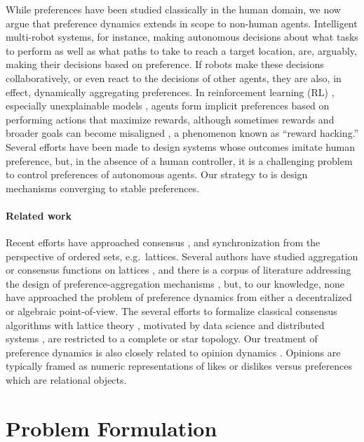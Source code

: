 \documentclass[conference]{ieeeconf}
\begin{document}
While preferences have been studied classically in the human domain, we now argue that preference dynamics extends in scope to non-human agents.
Intelligent multi-robot systems, for instance, making autonomous decisions about what tasks to perform as well as what paths to take to reach a target location, are, arguably, making their decisions based on preference. If robots make these decisions collaboratively, or even react to the decisions of other agents, they are also, in effect, dynamically aggregating preferences. In reinforcement learning (RL) \cite{furnkranz2012,wirth2017,natarajan2005}, especially unexplainable models \cite{christiano2017}, agents form implicit preferences based on performing actions that maximize rewards, although sometimes rewards and broader goals can become misaligned \cite{pan2022}, a phenomenon known as ``reward hacking.'' Several efforts \cite{huang2021,korbak2023,ibarz2018} have been made to design systems whose outcomes imitate human preference, but, in the absence of a human controller, it is a challenging problem to control preferences of autonomous agents. Our strategy to is design  mechanisms converging to stable preferences.

\paragraph*{Related work}

Recent efforts have approached consensus \cite{riess2022}, and synchronization \cite{riess2023} from the perspective of ordered sets, e.g.~lattices. Several authors have studied aggregation or consensus functions on lattices \cite{frenchdudes}, and there is a corpus of literature addressing the design of preference-aggregation mechanisms \cite{arrow2012}, but, to our knowledge, none have approached the problem of preference dynamics from either a decentralized or algebraic point-of-view. The several efforts to formalize classical consensus algorithms with lattice theory \cite{barthelemy1991}, motivated by data science \cite{jeanpierre1986} and distributed systems \cite{attiya1995}, are restricted to a complete or star topology. Our treatment of preference dynamics is also closely related to opinion dynamics \cite{noorazar2020}. Opinions are typically framed as numeric representations of likes or dislikes versus preferences which are relational objects.


\section{Problem Formulation}
\end{document}

